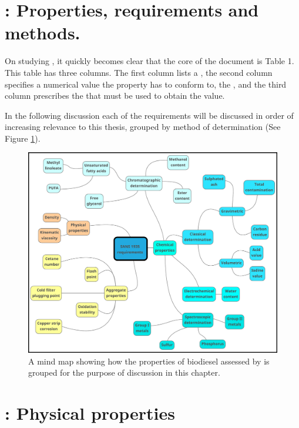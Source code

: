 \section{\texorpdfstring{}{SANS 1935}: Properties, requirements and methods.}

On studying , it quickly becomes clear that the core of the
document is Table 1. This table has three columns. The first column lists a
, the second column specifies a numerical value the property
has to conform to, the , and the third column prescribes
the  that must be used to obtain the value.

In the following discussion each of the requirements will be discussed in order
of increasing relevance to this thesis, grouped by method of determination (See
Figure \ref{fig:MindMap}).


\begin{figure}
\centering
\includegraphics[width=\textwidth]{Figures/SANS1935MindMap.pdf}
\decoRule

\caption[Discussion of ]{A mind map showing how the properties of
biodiesel assessed by  is grouped for the purpose of discussion
in this chapter.}

\label{fig:MindMap}
\end{figure}

\section{\texorpdfstring{}{SANS 1935}: Physical properties}

